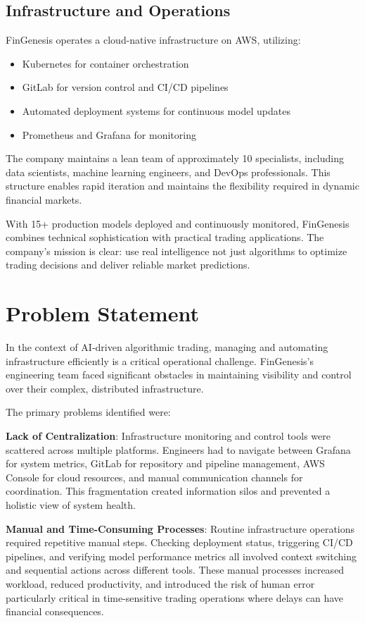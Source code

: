 \subsection*{Infrastructure and Operations}

FinGenesis operates a cloud-native infrastructure on AWS, utilizing:

\begin{itemize}
    \item Kubernetes for container orchestration
    \item GitLab for version control and CI/CD pipelines
    \item Automated deployment systems for continuous model updates
    \item Prometheus and Grafana for monitoring
\end{itemize}

The company maintains a lean team of approximately 10 specialists, including data scientists, machine learning engineers, and DevOps professionals. This structure enables rapid iteration and maintains the flexibility required in dynamic financial markets.

With 15+ production models deployed and continuously monitored, FinGenesis combines technical sophistication with practical trading applications. The company's mission is clear: use real intelligence not just algorithms to optimize trading decisions and deliver reliable market predictions.
\newpage
\section{Problem Statement}

In the context of AI-driven algorithmic trading, managing and automating infrastructure efficiently is a critical operational challenge. FinGenesis's engineering team faced significant obstacles in maintaining visibility and control over their complex, distributed infrastructure.

The primary problems identified were:

\textbf{Lack of Centralization}: Infrastructure monitoring and control tools were scattered across multiple platforms. Engineers had to navigate between Grafana for system metrics, GitLab for repository and pipeline management, AWS Console for cloud resources, and manual communication channels for coordination. This fragmentation created information silos and prevented a holistic view of system health.

\textbf{Manual and Time-Consuming Processes}: Routine infrastructure operations required repetitive manual steps. Checking deployment status, triggering CI/CD pipelines, and verifying model performance metrics all involved context switching and sequential actions across different tools. These manual processes increased workload, reduced productivity, and introduced the risk of human error particularly critical in time-sensitive trading operations where delays can have financial consequences.

